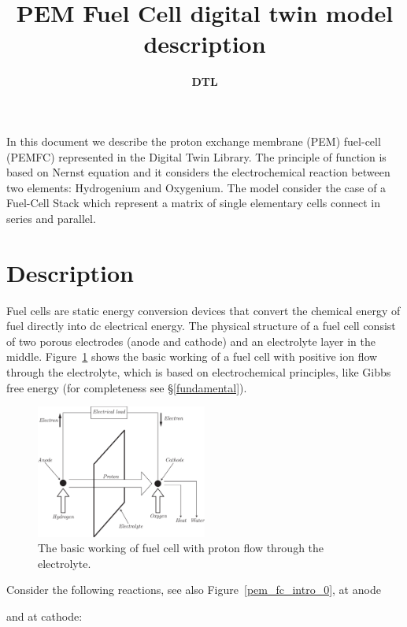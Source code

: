 \documentclass[11pt,a4paper]{article}
\title{\textbf{PEM Fuel Cell digital twin model description}}
\author{\textbf{DTL}}
\numberwithin{equation}{section}
\theoremstyle{it}
\theoremstyle{definition}
\begin{document}
	\thispagestyle{firstpage}
	\begin{mybox}
		\maketitle
		\vspace{125mm}
	\end{mybox}
	\newpage
	\tableofcontents
	\listoffigures	
	\listoftables
	\newpage

{In this document we describe the proton exchange membrane (PEM) fuel-cell (PEMFC) represented in the Digital Twin Library. The principle of function is based on Nernst equation and it considers the electrochemical reaction between two elements: Hydrogenium and Oxygenium. The model consider the case of a Fuel-Cell Stack which represent a matrix of single elementary cells connect in series and parallel.}

\section{Description}
Fuel cells are static energy conversion devices that convert the chemical energy of fuel directly into dc electrical energy. The physical structure of a fuel cell consist of two porous electrodes (anode and cathode) and an electrolyte layer in the middle. Figure~\ref{pem_fc_intro_2} shows the basic working of a fuel cell with positive ion flow through the electrolyte, which is based on electrochemical principles, like Gibbs free energy (for completeness see §\ref{fundamental}).
\begin{figure}[H]
	\centering
	\includegraphics[width = 0.5\textwidth, width = 250pt, angle = 0, keepaspectratio]{figures/pem_fuel_cell/basic_working.eps}
	\captionsetup{width=0.5\textwidth}		
	\caption{The basic working of fuel cell with proton flow through the electrolyte.}
	\label{pem_fc_intro_2}
\end{figure}
Consider the following reactions, see also Figure~\ref{pem_fc_intro_0}, at anode
\begin{center}
\end{center}
and at cathode:
\begin{center}
\end{center}
\end{document}
